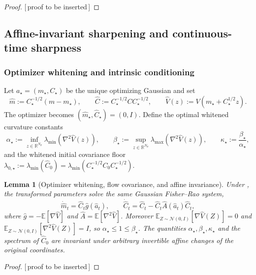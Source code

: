 \documentclass[11pt]{article}
\theoremstyle{plain}
\newtheorem{lemma}[lemma]{Lemma}
\theoremstyle{definition}
\theoremstyle{remark}
\newcommand{\R}{\mathbb{R}}
\newcommand{\N}{\mathcal{N}}
\newcommand{\E}{\mathbb{E}}
\newcommand{\Id}{I}
\newcommand{\PROOFHOLE}{{\color{red}\textsf{[\,proof to be inserted\,]}}}
\newcommand{\alphastar}{\alpha_\star}
\newcommand{\betastar}{\beta_\star}
\newcommand{\kappastar}{\kappa_\star}
\begin{document}
\begin{proof}
\PROOFHOLE
\end{proof}

\subsection{Affine-invariant sharpening and continuous-time sharpness}
\label{sec:cont-sharp}

\subsubsection{Optimizer whitening and intrinsic conditioning}

Let $a_\star=(m_\star,C_\star)$ be the unique optimizing Gaussian and set
\begin{equation}
\label{eq:optimizer-whitening}
    \widehat m:=C_\star^{-1/2}(m-m_\star),\qquad
    \widehat C:=C_\star^{-1/2}CC_\star^{-1/2},\qquad
    \widehat V(z):=V(m_\star+C_\star^{1/2}z).
\end{equation}
The optimizer becomes $(\widehat m_\star,\widehat C_\star)=(0,\Id)$. Define the optimal whitened
curvature constants
\begin{equation}
\label{eq:star-curvature}
    \alphastar:=\inf_{z\in\R^{N_\theta}}\lambda_{\min}(\nabla^2\widehat V(z)),\qquad
    \betastar:=\sup_{z\in\R^{N_\theta}}\lambda_{\max}(\nabla^2\widehat V(z)),\qquad
    \kappastar:=\frac{\betastar}{\alphastar},
\end{equation}
and the whitened initial covariance floor
$\lambda_{0,\star}:=\lambda_{\min}(\widehat C_0)=\lambda_{\min}(C_\star^{-1/2}C_0C_\star^{-1/2})$.

\begin{lemma}[Optimizer whitening, flow covariance, and affine invariance]
\label{lem:optimizer-whitening}
Under , the transformed parameters solve the same Gaussian Fisher--Rao
system,
\begin{equation}
\label{eq:whitened-flow}
    \dot{\widehat m}_t=\widehat C_t\widehat g(\widehat a_t),\qquad
    \dot{\widehat C}_t=\widehat C_t-\widehat C_t\widehat A(\widehat a_t)\widehat C_t,
\end{equation}
where $\widehat g=-\E[\nabla\widehat V]$ and $\widehat A=\E[\nabla^2\widehat V]$. Moreover
$\E_{Z\sim\N(0,\Id)}[\nabla\widehat V(Z)]=0$ and $\E_{Z\sim\N(0,\Id)}[\nabla^2\widehat V(Z)]=\Id$, so
$\alphastar\leq1\leq\betastar$. The quantities $\alphastar,\betastar,\kappastar$ and the spectrum of
$\widehat C_0$ are invariant under arbitrary invertible affine changes of the original coordinates.
\end{lemma}
\begin{proof}
\PROOFHOLE
\end{proof}
\end{document}
